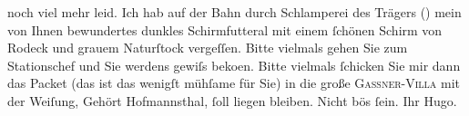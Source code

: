 \begin{ledgroupsized}[t]{13cm}
               noch viel mehr leid. Ich hab auf der Bahn durch Schlamperei des Trägers () mein von Ihnen bewundertes dunkles Schirmfutteral mit einem {\pb}ſchönen Schirm von Rodeck und grauem Naturſtock vergeſſen. Bitte
               vielmals gehen Sie zum Stationschef und Sie werdens gewiſs beko{\geminationm}en.
               Bitte vielmals ſchicken Sie mir dann das Packet (das ist das wenigſt mühſame für Sie)
                  {\pb}in die große \textsc{Gassner-Villa} mit der Weiſung, Gehört Hofmannsthal, ſoll liegen bleiben.\pend
           \pstart Nicht bös ſein. Ihr \spacefill\mbox{Hugo.}\pend{}
         
         \endnumbering{}\end{ledgroupsized}  \newcommand{\dateiname}{L00969}\newcommand{\titel}{Hugo von Hofmannsthal an Arthur Schnitzler, [8. 9. 1899]}\newcommand{\editorInnen}{Martin Anton Müller und Gerd-Hermann Susen}
      